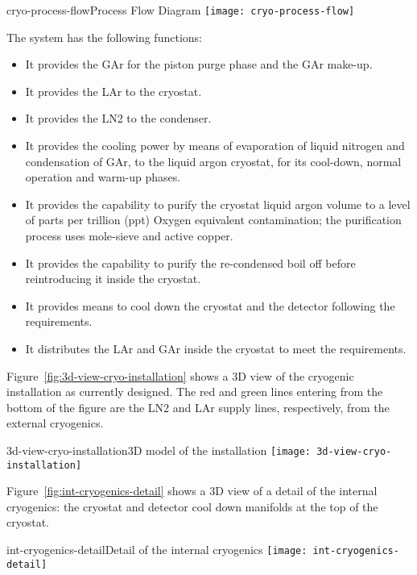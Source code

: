\begin{cdrfigure}{cryo-process-flow}{Process Flow Diagram} 
\texttt{[image: cryo-process-flow]}
\end{cdrfigure}

The system has the following functions:

\begin{itemize}
\item It provides the GAr for the piston purge phase and the GAr make-up.
\item  It provides the LAr to the cryostat.
\item  It provides the LN2 to the condenser.
\item  It provides the cooling power by means of evaporation of liquid nitrogen and condensation of GAr, to the liquid argon cryostat, for its cool-down, normal operation and warm-up phases.
\item  It provides the capability to purify the cryostat liquid argon volume to a level of parts per trillion (ppt) Oxygen equivalent contamination; the purification process uses mole-sieve and active copper.
\item  It provides the capability to purify the re-condensed boil off before reintroducing it inside the cryostat.
\item  It provides means to cool down the cryostat and the detector following the requirements.
\item  It distributes the LAr and GAr inside the cryostat to meet the requirements.
\end{itemize}

Figure~\ref{fig:3d-view-cryo-installation} shows a 3D view of the cryogenic installation as currently designed. The red and green lines entering  from the bottom of the figure are the LN2 and LAr supply lines, respectively, from the external cryogenics.
%
\begin{cdrfigure}{3d-view-cryo-installation}{3D model of the installation } 
\texttt{[image: 3d-view-cryo-installation]}
\end{cdrfigure}
%
Figure~\ref{fig:int-cryogenics-detail} shows a 3D view of a detail of the internal cryogenics: the cryostat and detector cool down manifolds at the top of the cryostat.
%
\begin{cdrfigure}{int-cryogenics-detail}{Detail of the internal cryogenics} 
\texttt{[image: int-cryogenics-detail]}
\end{cdrfigure}

